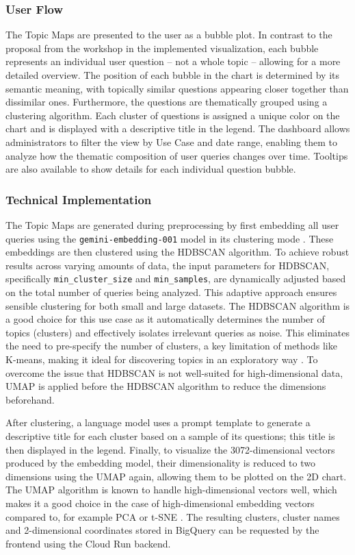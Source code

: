\documentclass[
	english,
	ruledheaders=section,%
	class=report,%
	thesis={type=bachelor},%
	accentcolor=1b,%
	custommargins=true,%
	marginpar=false,%
	parskip=half-,%
	fontsize=11pt,%
	DIV=14,
]{tudapub}
\begin{document}
\subsubsection{User Flow}
The Topic Maps are presented to the user as a bubble plot. In contrast to the proposal from the workshop in the implemented visualization, each bubble represents an individual user question -- not a whole topic -- allowing for a more detailed overview. The position of each bubble in the chart is determined by its semantic meaning, with topically similar questions appearing closer together than dissimilar ones. Furthermore, the questions are thematically grouped using a clustering algorithm. Each cluster of questions is assigned a unique color on the chart and is displayed with a descriptive title in the legend. The dashboard allows administrators to filter the view by Use Case and date range, enabling them to analyze how the thematic composition of user queries changes over time. Tooltips are also available to show details for each individual question bubble.

\subsubsection{Technical Implementation}
The Topic Maps are generated during preprocessing by first embedding all user queries using the \texttt{gemini-embedding-001} model in its clustering mode \parencite{GoogleEmbedding001}. These embeddings are then clustered using the HDBSCAN algorithm. To achieve robust results across varying amounts of data, the input parameters for HDBSCAN, specifically \texttt{min\_cluster\_size} and \texttt{min\_samples}, are dynamically adjusted based on the total number of queries being analyzed. This adaptive approach ensures sensible clustering for both small and large datasets. The HDBSCAN algorithm is a good choice for this use case as it automatically determines the number of topics (clusters) and effectively isolates irrelevant queries as noise. This eliminates the need to pre-specify the number of clusters, a key limitation of methods like K-means, making it ideal for discovering topics in an exploratory way \parencite{Baligodugula2025}. To overcome the issue that HDBSCAN is not well-suited for high-dimensional data, UMAP is applied before the HDBSCAN algorithm to reduce the dimensions beforehand.

After clustering, a language model uses a prompt template to generate a descriptive title for each cluster based on a sample of its questions; this title is then displayed in the legend. Finally, to visualize the 3072-dimensional vectors produced by the embedding model, their dimensionality is reduced to two dimensions using the UMAP again, allowing them to be plotted on the 2D chart. The UMAP algorithm is known to handle high-dimensional vectors well, which makes it a good choice in the case of high-dimensional embedding vectors compared to, for example PCA or t-SNE \parencite{McInnes2020}.
The resulting clusters, cluster names and 2-dimensional coordinates stored in BigQuery can be requested by the frontend using the Cloud Run backend.
\end{document}
